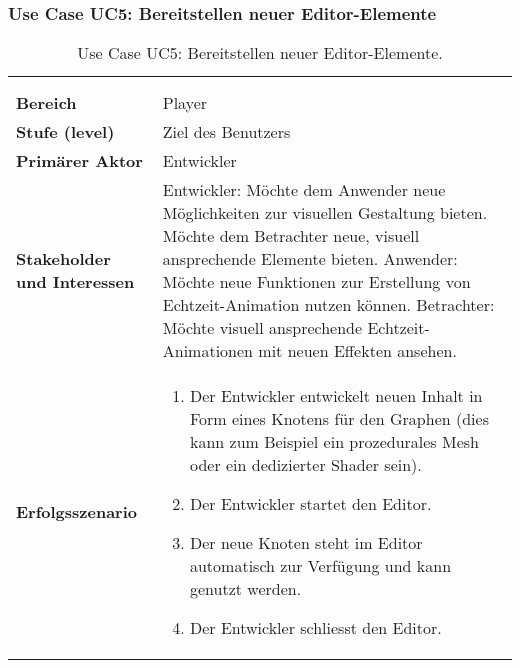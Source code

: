 
\subsubsection{Use Case UC5: Bereitstellen neuer Editor-Elemente}
\label{ssubsec:requirements:use-cases:uc5}

\begin{longtabu}{p{0.5\textwidth}p{0.5\textwidth}}
    \centering\\
    \caption{Use Case UC5: Bereitstellen neuer
        Editor-Elemente.}\label{table:uc5-add-new-elements}\\
    \toprule
        \textbf{Bereich} &
        Player\\
    \cmidrule(r){1-1}\cmidrule(lr){2-2}
        \textbf{Stufe (level)} &
        Ziel des Benutzers \\
    \cmidrule(r){1-1}\cmidrule(lr){2-2}
        \textbf{Primärer Aktor} &
        Entwickler \\
    \cmidrule(r){1-1}\cmidrule(lr){2-2}
        \textbf{Stakeholder und Interessen} &
        Entwickler: Möchte dem Anwender neue Möglichkeiten zur visuellen
        Gestaltung bieten. Möchte dem Betrachter neue, visuell ansprechende
        Elemente bieten. \newline
        Anwender: Möchte neue Funktionen zur Erstellung von
        Echtzeit-Animation nutzen können. \newline
        Betrachter: Möchte visuell ansprechende Echtzeit-Animationen mit
        neuen Effekten ansehen. \\
    \cmidrule(r){1-1}\cmidrule(lr){2-2}
        \textbf{Erfolgsszenario} &
        \begin{enumerate}
            \item{Der Entwickler entwickelt neuen Inhalt in Form eines
                    Knotens für den Graphen (dies kann zum Beispiel ein
                    prozedurales Mesh oder ein dedizierter Shader sein).}
            \item{Der Entwickler startet den Editor.}
            \item{Der neue Knoten steht im Editor automatisch zur Verfügung
                    und kann genutzt werden.}
            \item{Der Entwickler schliesst den Editor.}
        \end{enumerate} \\

\end{longtabu}
